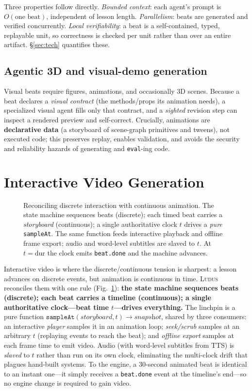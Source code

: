 \documentclass[sigconf,review,anonymous]{acmart}
\newcommand{\sys}{\textsc{Ludus}\xspace}
\begin{document}
Three properties follow directly. \emph{Bounded context}: each agent's prompt
is $O(\text{one beat})$, independent of lesson length. \emph{Parallelism}: beats
are generated and verified concurrently. \emph{Local verifiability}: a beat is a
self-contained, typed, replayable unit, so correctness is checked per unit
rather than over an entire artifact. \S\ref{sec:tech} quantifies these.

\subsection{Agentic 3D and visual-demo generation}
Visual beats require figures, animations, and occasionally 3D scenes. Because a
beat declares a \emph{visual contract} (the methods/props its animation needs),
a specialized visual agent fills only that contract, and a \emph{sighted}
revision step can inspect a rendered preview and self-correct. Crucially,
animations are \textbf{declarative data} (a storyboard of scene-graph primitives
and tweens), not executed code; this preserves replay, enables validation, and
avoids the security and reliability hazards of generating and \texttt{eval}-ing
code.

\section{Interactive Video Generation}
\label{sec:video}

\begin{figure}[t]
  \centering
  \resizebox{\columnwidth}{!}{}
  \caption{Reconciling discrete interaction with continuous animation. The state
  machine sequences beats (discrete); each timed beat carries a \emph{storyboard}
  (continuous); a single authoritative clock $t$ drives a \emph{pure}
  \texttt{sampleAt}. The same function feeds interactive playback and offline
  frame export; audio and word-level subtitles are slaved to $t$. At $t=\text{dur}$
  the clock emits \texttt{beat.done} and the machine advances.}
  \label{fig:video}
\end{figure}

Interactive video is where the discrete/continuous tension is sharpest: a lesson
advances on discrete events, but animation is continuous in time. \sys{}
reconciles them with one rule (Fig.~\ref{fig:video}): \textbf{the state machine
sequences beats (discrete); each beat carries a timeline (continuous); a single
authoritative clock---beat time $t$---drives everything.} The linchpin is a pure
function $\texttt{sampleAt}(\textit{storyboard}, t)\!\to\!\textit{snapshot}$,
shared by three consumers: an interactive \emph{player} samples it in an
animation loop; \emph{seek/scrub} samples at an arbitrary $t$ (replaying events
to reach the beat); and \emph{offline export} samples at each frame time to emit
video. Audio (with word-level subtitles from TTS) is \emph{slaved} to $t$ rather
than run on its own clock, eliminating the multi-clock drift that plagues
hand-built systems. To the engine, a 30-second animated beat is identical to an
instant one---it simply receives a \texttt{beat.done} event at the timeline's
end---so no engine change is required to gain video.
\end{document}
